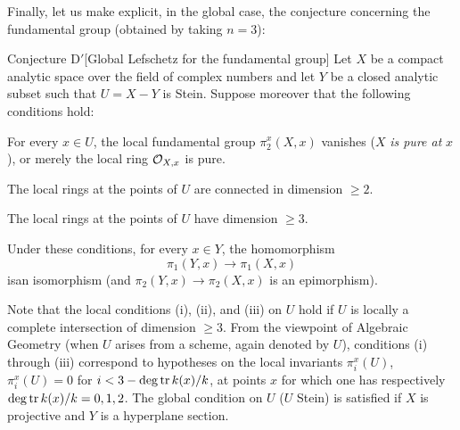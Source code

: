 Finally, let us make explicit, in the \og global case\fg {}, the conjecture concerning the fundamental group (obtained by taking $n=3$):

\label{XIII.6.D'}
\begin{enonce*}{Conjecture D$\boldsymbol'$}[Global Lefschetz for the fundamental group\ndemark]
Let $X$ be a compact analytic space over the field of complex numbers and let $Y$ be a closed analytic subset such that $U=X-Y$ is Stein. Suppose moreover that the following conditions hold:
\begin{enumeratei}
\item
For every $x\in U$, the local fundamental group $\pi_2^x(X,x)$ vanishes (\ie $X$ \emph{is \og pure at }$x$\fg), or merely the local ring $\mathcal O_{X,x}$ is pure.
\item
The local rings at the points of $U$ are \og connected in dimension $\geq 2$\fg.
\item
The local rings at the points of $U$ have dimension $\geq 3$.
\end{enumeratei}

Under these conditions, for every $x\in Y$, the homomorphism
$$
\pi_1(Y,x)\to\pi_1(X,x)
$$
is\pageoriginale an isomorphism (and $\pi_2(Y,x)\to\pi_2(X,x)$ is an epimorphism).
\end{enonce*}

Note that the local conditions (i), (ii), and (iii) on $U$ hold if $U$ is locally a complete intersection of dimension $\geq 3$. From the viewpoint of Algebraic Geometry (when $U$ arises from a scheme, again denoted by $U$), conditions (i) through (iii) correspond to hypotheses on the local invariants $\pi_i^x(U)$,  \hbox{$\pi_i^x(U)=0$} for $i<3-\operatorname{deg\,tr} k(x)/k$, at points $x$ for which one has respectively $\operatorname{deg\,tr} k(x)/k=0,1,2$. The global condition on $U$ ($U$ Stein) is satisfied if $X$ is projective and $Y$ is a hyperplane section.

